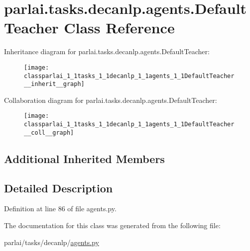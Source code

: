 \hypertarget{classparlai_1_1tasks_1_1decanlp_1_1agents_1_1DefaultTeacher}{}\section{parlai.\+tasks.\+decanlp.\+agents.\+Default\+Teacher Class Reference}
\label{classparlai_1_1tasks_1_1decanlp_1_1agents_1_1DefaultTeacher}


Inheritance diagram for parlai.\+tasks.\+decanlp.\+agents.\+Default\+Teacher\+:
\nopagebreak
\begin{figure}[H]
\begin{center}
\leavevmode
\texttt{[image: classparlai\_1\_1tasks\_1\_1decanlp\_1\_1agents\_1\_1DefaultTeacher\_\_inherit\_\_graph]}
\end{center}
\end{figure}


Collaboration diagram for parlai.\+tasks.\+decanlp.\+agents.\+Default\+Teacher\+:
\nopagebreak
\begin{figure}[H]
\begin{center}
\leavevmode
\texttt{[image: classparlai\_1\_1tasks\_1\_1decanlp\_1\_1agents\_1\_1DefaultTeacher\_\_coll\_\_graph]}
\end{center}
\end{figure}
\subsection*{Additional Inherited Members}


\subsection{Detailed Description}


Definition at line 86 of file agents.\+py.



The documentation for this class was generated from the following file\+:\begin{DoxyCompactItemize}
\item 
parlai/tasks/decanlp/\hyperlink{parlai_2tasks_2decanlp_2agents_8py}{agents.\+py}\end{DoxyCompactItemize}
